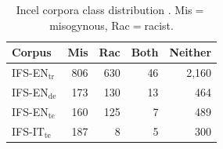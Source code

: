 \documentclass[11pt]{article}
\newcommand{\dsITclassification}{IFS-IT}
\newcommand{\dsENclassificationtrain}{IFS-EN$_{\mbox{tr}}$} %
\newcommand{\dsENclassificationdev}{IFS-EN$_{\mbox{de}}$} %
\newcommand{\dsENclassificationtest}{IFS-EN$_{\mbox{te}}$} %
\begin{document}
\begin{table}[t]
  \caption{Incel corpora class distribution \cite{gajo2023identification}. Mis$=$misogynous, Rac$=$racist.}
  \label{tab:incel-distribution}
  \centering
  \begin{tabular}{l|rrrr}
    \hline
    \bf Corpus                & \bf Mis& \bf Rac & \bf Both & \bf  Neither \\
    \hline
    \dsENclassificationtrain\,	&  806 & 630 & 46 & 
  2,160 \\
    \dsENclassificationdev 	&  173 & 130 & 13 & 464 \\
    \dsENclassificationtest 	&  160 & 125 & 7 & 489 \\
    \dsITclassification$_{\mbox{te}}$  & 187 & 8 & 5 & 300 \\
    \hline
    \end{tabular}
\end{table}
\end{document}
